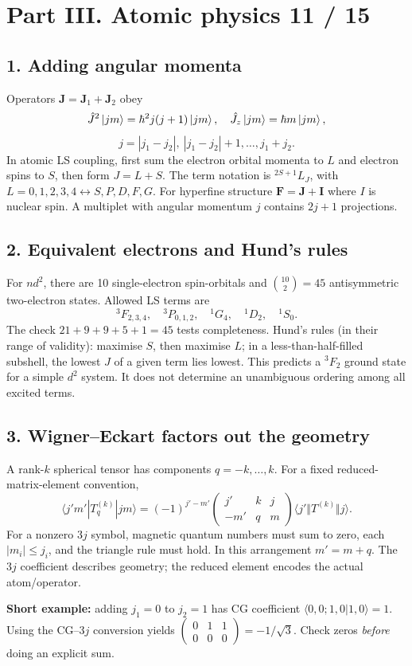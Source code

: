 
\section*{Part III. Atomic physics \hfill 11 / 15}
\subsection*{1. Adding angular momenta}
Operators \(\mathbf J=\mathbf J_1+\mathbf J_2\) obey
\[
\hat J^2\left\lvert jm\right\rangle=\hbar^2j(j+1)\left\lvert jm\right\rangle,\quad
\hat J_z\left\lvert jm\right\rangle=\hbar m\left\lvert jm\right\rangle,
\]
\[
\boxed{j=|j_1-j_2|,\ |j_1-j_2|+1,\ldots,j_1+j_2.}
\]
In atomic LS coupling, first sum the electron orbital momenta
to \(L\) and electron spins to \(S\), then form \(J=L+S\).
The term notation is \({}^{2S+1}L_J\), with
\(L=0,1,2,3,4\leftrightarrow S,P,D,F,G\).
For hyperfine structure \(\mathbf F=\mathbf J+\mathbf I\)
where \(I\) is nuclear spin. A multiplet with angular momentum
\(j\) contains \(2j+1\) projections.

\subsection*{2. Equivalent electrons and Hund's rules}
For \(nd^2\), there are 10 single-electron spin-orbitals
and \(\binom{10}{2}=45\) antisymmetric two-electron states.
Allowed LS terms are
\[
{}^3F_{2,3,4},\quad {}^3P_{0,1,2},\quad
{}^1G_4,\quad{}^1D_2,\quad{}^1S_0.
\]
The check \(21+9+9+5+1=45\) tests completeness.
Hund's rules (in their range of validity): maximise \(S\),
then maximise \(L\); in a less-than-half-filled subshell,
the lowest \(J\) of a given term lies lowest. This predicts
a \({}^3F_2\) ground state for a simple \(d^2\) system.
It does not determine an unambiguous ordering among all
excited terms.

\subsection*{3. Wigner--Eckart factors out the geometry}
A rank-\(k\) spherical tensor has components \(q=-k,\dots,k\).
For a fixed reduced-matrix-element convention,
\[
\boxed{\langle j'm'|T_q^{(k)}|jm\rangle=
(-1)^{j'-m'}\!
\begin{pmatrix}j'&k&j\\-m'&q&m\end{pmatrix}
\langle j'\Vert T^{(k)}\Vert j\rangle.}
\]
For a nonzero \(3j\) symbol, magnetic quantum numbers must
sum to zero, each \(|m_i|\le j_i\), and the triangle rule must
hold. In this arrangement \(m'=m+q\).
The \(3j\) coefficient describes geometry; the reduced element
encodes the actual atom/operator.
\begin{methodbox}
\textbf{Short example:} adding \(j_1=0\) to \(j_2=1\)
has CG coefficient \(\langle 0,0;1,0|1,0\rangle=1\).
Using the CG--\(3j\) conversion yields
\(\begin{pmatrix}0&1&1\\0&0&0\end{pmatrix}=-1/\sqrt3\).
Check zeros \emph{before} doing an explicit sum.
\end{methodbox}
